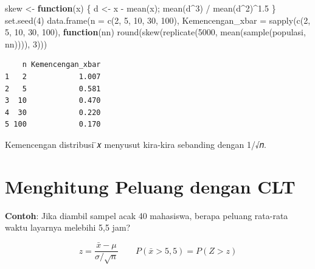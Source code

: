 \documentclass[
  indonesian,
  letterpaper,
]{book}
\newenvironment{Shaded}{\begin{snugshade}}{\end{snugshade}}
\newcommand{\AttributeTok}[1]{\textcolor[rgb]{0.40,0.45,0.13}{#1}}
\newcommand{\ControlFlowTok}[1]{\textcolor[rgb]{0.00,0.23,0.31}{\textbf{#1}}}
\newcommand{\DecValTok}[1]{\textcolor[rgb]{0.68,0.00,0.00}{#1}}
\newcommand{\FloatTok}[1]{\textcolor[rgb]{0.68,0.00,0.00}{#1}}
\newcommand{\FunctionTok}[1]{\textcolor[rgb]{0.28,0.35,0.67}{#1}}
\newcommand{\NormalTok}[1]{\textcolor[rgb]{0.00,0.23,0.31}{#1}}
\newcommand{\OtherTok}[1]{\textcolor[rgb]{0.00,0.23,0.31}{#1}}
\newcommand{\SpecialCharTok}[1]{\textcolor[rgb]{0.37,0.37,0.37}{#1}}
\begin{document}
\begin{Shaded}
\begin{Highlighting}[]
\NormalTok{skew }\OtherTok{\textless{}{-}} \ControlFlowTok{function}\NormalTok{(x) \{ d }\OtherTok{\textless{}{-}}\NormalTok{ x }\SpecialCharTok{{-}} \FunctionTok{mean}\NormalTok{(x); }\FunctionTok{mean}\NormalTok{(d}\SpecialCharTok{\^{}}\DecValTok{3}\NormalTok{) }\SpecialCharTok{/} \FunctionTok{mean}\NormalTok{(d}\SpecialCharTok{\^{}}\DecValTok{2}\NormalTok{)}\SpecialCharTok{\^{}}\FloatTok{1.5}\NormalTok{ \}}
\FunctionTok{set.seed}\NormalTok{(}\DecValTok{4}\NormalTok{)}
\FunctionTok{data.frame}\NormalTok{(}\AttributeTok{n =} \FunctionTok{c}\NormalTok{(}\DecValTok{2}\NormalTok{, }\DecValTok{5}\NormalTok{, }\DecValTok{10}\NormalTok{, }\DecValTok{30}\NormalTok{, }\DecValTok{100}\NormalTok{),}
\AttributeTok{Kemencengan\_xbar =} \FunctionTok{sapply}\NormalTok{(}\FunctionTok{c}\NormalTok{(}\DecValTok{2}\NormalTok{, }\DecValTok{5}\NormalTok{, }\DecValTok{10}\NormalTok{, }\DecValTok{30}\NormalTok{, }\DecValTok{100}\NormalTok{), }\ControlFlowTok{function}\NormalTok{(nn)}
\FunctionTok{round}\NormalTok{(}\FunctionTok{skew}\NormalTok{(}\FunctionTok{replicate}\NormalTok{(}\DecValTok{5000}\NormalTok{, }\FunctionTok{mean}\NormalTok{(}\FunctionTok{sample}\NormalTok{(populasi, nn)))), }\DecValTok{3}\NormalTok{)))}
\end{Highlighting}
\end{Shaded}

\begin{verbatim}
    n Kemencengan_xbar
1   2            1.007
2   5            0.581
3  10            0.470
4  30            0.220
5 100            0.170
\end{verbatim}

Kemencengan distribusi ̄𝑥 menyusut kira-kira sebanding dengan 1/√𝑛.

\section{Menghitung Peluang dengan
CLT}\label{menghitung-peluang-dengan-clt}

\textbf{Contoh}: Jika diambil sampel acak 40 mahasiswa, berapa peluang
rata-rata waktu layarnya melebihi 5,5 jam?

\[z = \frac{\bar{x} - \mu}{\sigma / \sqrt{n}} \qquad P(\bar{x} > 5,5) = P(Z > z)\]
\end{document}
